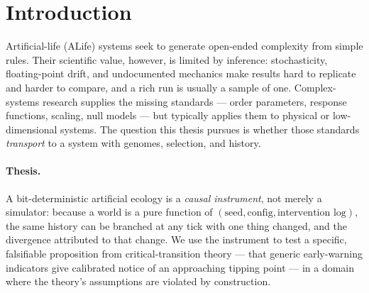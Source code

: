 \documentclass[11pt,a4paper]{article}
\begin{document}
\begin{abstract}
We treat the negative result as the scientific product and the instrument as
what makes it credible. We state the candidate mechanisms (detection-bar
rigidity, detrending artifact, vanishing order parameter, evolutionary rescue),
the ablations that separate them, and a direct impulse-response measurement of
critical slowing down that the usual autocorrelation proxy only approximates. A
first ablation is decisive against one of them: removing de-novo mutation and
lateral gene transfer leaves the lead slope unchanged (clonal retains 100\%,
$[-0.0181,-0.0088]$ against $[-0.0203,-0.0120]$), even though quadrupling the
mutation supply cuts collapse from 43/48 to 25/48 (Fisher exact
$p = 9.1\times10^{-5}$). Adaptation changes whether the system collapses, not the
warning lead. The broader methodological claim is that emergence claims should be
adjudicated by a falsifier-first ledger with artifact-level reproducibility, not
by narrative or internal composite scores --- and that a single specification,
including the one in this thesis's first draft, overstates how settled a result
is.
\end{abstract}

\section{Introduction}
Artificial-life (ALife) systems \citep{langton1990,ray1991,ofria2004} seek to
generate open-ended complexity from simple rules. Their scientific value,
however, is limited by inference: stochasticity, floating-point drift, and
undocumented mechanics make results hard to replicate and harder to compare, and
a rich run is usually a sample of one. Complex-systems research supplies the
missing standards --- order parameters, response functions, scaling, null
models --- but typically applies them to physical or low-dimensional systems.
The question this thesis pursues is whether those standards \emph{transport} to
a system with genomes, selection, and history.

\paragraph{Thesis.} A bit-deterministic artificial ecology is a \emph{causal
instrument}, not merely a simulator: because a world is a pure function of
$(\text{seed}, \text{config}, \text{intervention log})$, the same history can be
branched at any tick with one thing changed, and the divergence attributed to
that change. We use the instrument to test a specific, falsifiable proposition
from critical-transition theory --- that generic early-warning indicators give
calibrated notice of an approaching tipping point --- in a domain where the
theory's assumptions are violated by construction.
\end{document}
